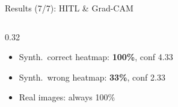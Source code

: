 \documentclass[aspectratio=169]{beamer}
\begin{document}
\begin{frame}{Results (7/7): HITL \& Grad-CAM}
\begin{columns}[T]
\begin{column}{0.32\textwidth}
      \vspace{0.2em}
      \begin{center}
      \begin{minipage}{0.92\linewidth}
      {%
      \begin{alertblock}{}\tiny
        \begin{itemize}\itemsep1pt\setlength{\leftmargini}{1em}
          \item Synth.\ correct heatmap: \textbf{100\%}, conf 4.33
          \item Synth.\ wrong heatmap: \textbf{33\%}, conf 2.33
          \item Real images: always 100\%
        \end{itemize}
      \end{alertblock}}
      \end{minipage}
      \end{center}
    \end{column}
  \end{columns}
\end{frame}

\end{document}
